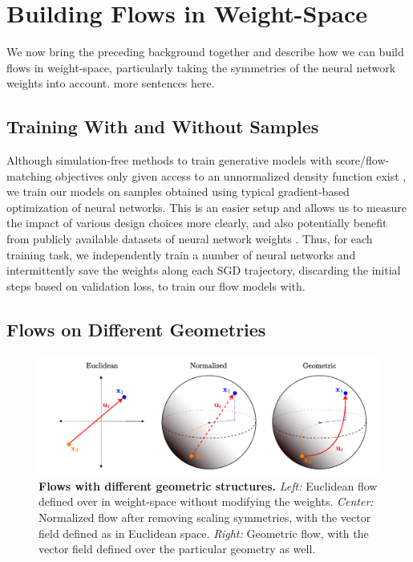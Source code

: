 
\chapter{Building Flows in Weight-Space}\label{chapter:method}

We now bring the preceding background together and describe how we can build flows in weight-space, particularly taking the symmetries of the neural network weights into account. {\color{TUMAccentOrange} more sentences here.}

\section{Training With and Without Samples}

Although simulation-free methods to train generative models with score/flow-matching objectives only given access to an unnormalized density function exist \citep{akhound-sadeghIteratedDenoisingEnergy2024}, we train our models on samples obtained using typical gradient-based optimization of neural networks. This is an easier setup and allows us to measure the impact of various design choices more clearly, and also potentially benefit from publicly available datasets of neural network weights \citep{schurholtModelZoosDataset2022,peeblesLearningLearnGenerative2022}. Thus, for each training task, we independently train a number of neural networks and intermittently save the weights along each SGD trajectory, discarding the initial steps based on validation loss, to train our flow models with. 

\section{Flows on Different Geometries}

\begin{figure}[h!]
    \centering
    \includegraphics[width=\textwidth]{figures/flow_types.drawio.pdf}
    \caption{\label{fig:flow_types}\textbf{Flows with different geometric structures.} \textit{Left:} Euclidean flow defined over in weight-space without modifying the weights. \textit{Center:} Normalized flow after removing scaling symmetries, with the vector field defined as in Euclidean space. \textit{Right:} Geometric flow, with the vector field defined over the particular geometry as well.}
\end{figure}

